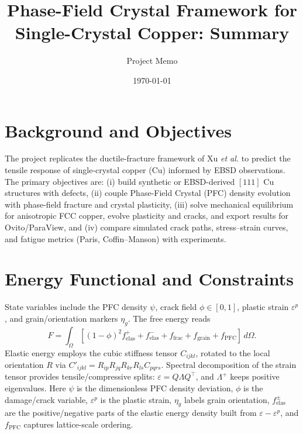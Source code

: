 \documentclass[11pt]{article}
\title{Phase-Field Crystal Framework for Single-Crystal Copper: Summary}
\author{Project Memo}
\date{\today}
\begin{document}
\maketitle

\section{Background and Objectives}
The project replicates the ductile-fracture framework of Xu \emph{et al.}\cite{paper} to predict the tensile response of single-crystal copper (Cu) informed by EBSD observations. The primary objectives are: (i) build synthetic or EBSD-derived $[111]$ Cu structures with defects, (ii) couple Phase-Field Crystal (PFC) density evolution with phase-field fracture and crystal plasticity, (iii) solve mechanical equilibrium for anisotropic FCC copper, evolve plasticity and cracks, and export results for Ovito/ParaView, and (iv) compare simulated crack paths, stress--strain curves, and fatigue metrics (Paris, Coffin--Manson) with experiments.

\section{Energy Functional and Constraints}
State variables include the PFC density $\psi$, crack field $\phi\in[0,1]$, plastic strain $\varepsilon^p$, and grain/orientation markers $\eta_g$. The free energy reads
\begin{equation}
F = \int_{\Omega} \left[(1-\phi)^2 f_{\text{elas}}^{+} + f_{\text{elas}}^{-} + f_{\text{frac}} + f_{\text{grain}} + f_{\text{PFC}} \right] \, d\Omega.
\end{equation}
Elastic energy employs the cubic stiffness tensor $C_{ijkl}$, rotated to the local orientation $R$ via $C'_{ijkl}=R_{ip}R_{jq}R_{kr}R_{ls} C_{pqrs}$. Spectral decomposition of the strain tensor provides tensile/compressive splits: $\varepsilon = Q\Lambda Q^{\top}$, and $\Lambda^{+}$ keeps positive eigenvalues.
Here $\psi$ is the dimensionless PFC density deviation, $\phi$ is the damage/crack variable, $\varepsilon^p$ is the plastic strain, $\eta_g$ labels grain orientation, $f_{\text{elas}}^{\pm}$ are the positive/negative parts of the elastic energy density built from $\varepsilon - \varepsilon^p$, and $f_{\text{PFC}}$ captures lattice-scale ordering.
\end{document}
